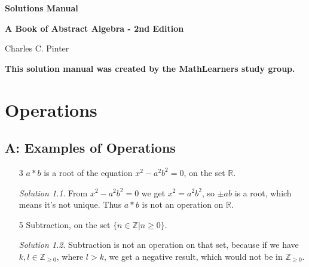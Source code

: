 \documentclass[11pt, b5paper, draft, fleqn]{book}
\theoremstyle{remark}
\newtheorem*{solution}{Solution}
\theoremstyle{plain}
\begin{document}
\begin{titlepage}	
	\begin{center}
	
	\huge
	\textbf{Solutions Manual}
    
	\vspace{2em}
	\Large
	\textbf{A Book of Abstract Algebra - 2nd Edition}
    
	Charles C. Pinter
	
	\vspace{2em}
	\large
	\textbf{This solution manual was created by the MathLearners study group.}
	
	\end{center}
\end{titlepage}

\fancyhf{}
\cleardoublepage
{}
\setcounter{page}{3}
\tableofcontents

\cleardoublepage

\fancyhf{}
\setcounter{page}{5}
\rhead{\thepage}
\lhead{\firstleftmark}
\sloppy

\setcounter{chapter}{1}
\chapter{Operations}
\section*{A: Examples of Operations}
\begin{enumerate}
    \item[3]
	\(a * b\) is a root of the equation \(x^2-a^2b^2 = 0\), on the set \(\mathbb{R}\).
	\begin{solution}
		From \(x^2-a^2b^2 = 0\) we get \(x^2=a^2b^2\), so \(\pm ab\) is a root, which means it's not unique. Thus \(a * b\) is not an operation on \(\mathbb{R}\).
	\end{solution}
	\item[5]
	Subtraction, on the set \(\{n \in \mathbb{Z} | n \geq 0\}\).
	\begin{solution}
		Subtraction is not an operation on that set, because if we have \(k, l \in \mathbb{Z}_{\geq0}\), where \(l > k\), we get a negative result, which would not be in \(\mathbb{Z}_{\geq0}\).
	\end{solution}
\end{enumerate}
\end{document}
